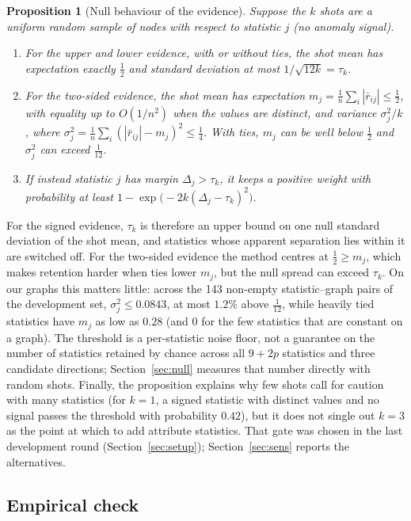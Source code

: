\documentclass[pdflatex,sn-mathphys-ay]{sn-jnl}
\theoremstyle{plain}
\newtheorem{proposition}{Proposition}
\theoremstyle{remark}
\begin{document}
\begin{proposition}[Null behaviour of the evidence]\label{prop:tau}
Suppose the $k$ shots are a uniform random sample of nodes with respect to statistic $j$ (no anomaly signal).
\begin{enumerate}
\item[(a)] For the upper and lower evidence, with or without ties, the shot mean has expectation exactly $\tfrac12$ and standard deviation at most $1/\sqrt{12k} = \tau_k$.
\item[(b)] For the two-sided evidence, the shot mean has expectation $m_j = \frac1n\sum_i |\bar r_{ij}| \le \tfrac12$, with equality up to $O(1/n^2)$ when the values are distinct, and variance $\sigma_{j}^2/k$, where $\sigma_j^2 = \frac1n\sum_i(|\bar r_{ij}| - m_j)^2 \le \tfrac14$. With ties, $m_j$ can be well below $\tfrac12$ and $\sigma_j^2$ can exceed $\tfrac1{12}$.
\item[(c)] If instead statistic $j$ has margin $\Delta_j > \tau_k$, it keeps a positive weight with probability at least $1 - \exp\!\big(-2k(\Delta_j - \tau_k)^2\big)$.
\end{enumerate}
\end{proposition}

For the signed evidence, $\tau_k$ is therefore an upper bound on one null standard deviation of the shot mean, and statistics whose apparent separation lies within it are switched off. For the two-sided evidence the method centres at $\tfrac12 \ge m_j$, which makes retention harder when ties lower $m_j$, but the null spread can exceed $\tau_k$. On our graphs this matters little: across the 143 non-empty statistic--graph pairs of the development set, $\sigma_j^2 \le 0.0843$, at most $1.2\%$ above $\tfrac1{12}$, while heavily tied statistics have $m_j$ as low as $0.28$ (and $0$ for the few statistics that are constant on a graph). The threshold is a per-statistic noise floor, not a guarantee on the number of statistics retained by chance across all $9+2p$ statistics and three candidate directions; Section~\ref{sec:null} measures that number directly with random shots. Finally, the proposition explains why few shots call for caution with many statistics (for $k=1$, a signed statistic with distinct values and no signal passes the threshold with probability $0.42$), but it does not single out $k = 3$ as the point at which to add attribute statistics. That gate was chosen in the last development round (Section~\ref{sec:setup}); Section~\ref{sec:sens} reports the alternatives.

\subsection{Empirical check}
\end{document}
